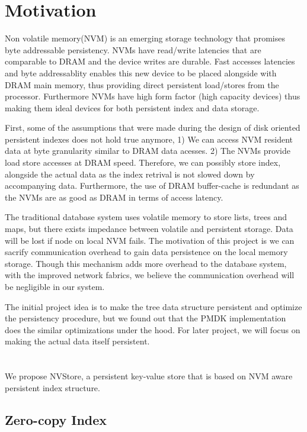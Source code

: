 \section{Motivation}
Non volatile memory(NVM) is an emerging storage technology that promises byte addressable 
persistency. NVMs have read/write latencies that are comparable to DRAM and the device 
writes are durable. Fast accesses latencies and byte addressablity enables this new device
to be placed alongside with DRAM main memory, thus providing direct persistent load/stores
from the processor. Furthermore NVMs have high form factor (high capacity devices) thus
making them ideal devices for both persistent index and data storage. 


First, some of the assumptions that were made during the design of disk oriented persistent
indexes does not hold true anymore, 1) We can access NVM resident data at byte granularity similar to
DRAM data acesses. 2) The NVMs provide load store accesses at DRAM speed. Therefore, we can
possibly store index, alongside the actual data as the index retrival is not slowed down by
accompanying data. Furthermore, the use of DRAM buffer-cache is redundant as the NVMs are 
as good as DRAM in terms of access latency.


The traditional database system uses volatile memory to store lists, trees and maps, but there exists 
impedance between volatile and persistent storage. Data will be lost if node on local NVM fails. The 
motivation of this project is we can sacrify communication overhead to gain data persistence on the 
local memory storage. Though this mechanism adds more overhead to the database system, with the improved
network fabrics, we believe the communication overhead will be negligible in our system. 

The initial project idea is to make the tree data structure persistent and optimize the persistency procedure, 
but we found out that the PMDK implementation does the similar optimizations under the hood. For later 
project, we will focus on making the actual data itself persistent. 

\section{}

We propose NVStore, a persistent key-value store that is based on NVM aware persistent index
structure. 

\subsection{Zero-copy Index}

